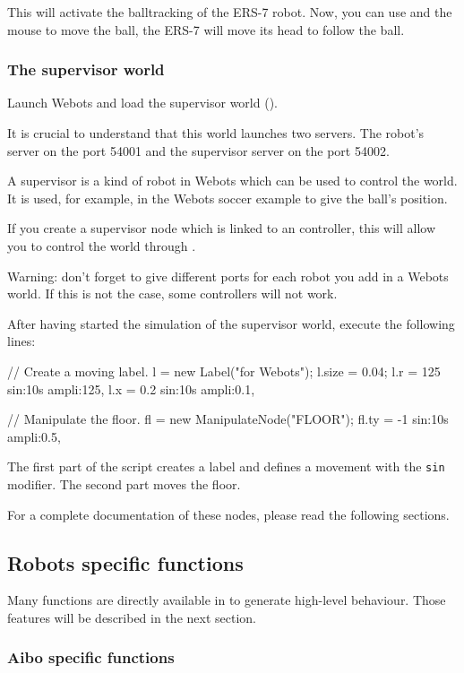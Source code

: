 This will activate the balltracking of the ERS-7 robot.  Now, you can
use  and the mouse to move the ball, the ERS-7 will move
its head to follow the ball.


\subsubsection{The supervisor world}

Launch Webots and load the supervisor world
().

It is crucial to understand that this world launches two \urbi
servers.  The robot's server on the port 54001 and the supervisor
server on the port 54002.

A supervisor is a kind of robot in Webots which can be used to control
the world. It is used, for example, in the Webots soccer example to
give the ball's position.

If you create a supervisor node which is linked to an \urbi
controller, this will allow you to control the world through \urbi.

Warning: don't forget to give different ports for each robot you add
in a Webots world. If this is not the case, some controllers will not
work.

After having started the simulation of the supervisor world, execute
the following lines:


\begin{urbifixme}
// Create a moving label.
l = new Label("\urbi for Webots");
l.size = 0.04;
l.r = 125 sin:10s ampli:125,
l.x = 0.2 sin:10s ampli:0.1,

// Manipulate the floor.
fl = new ManipulateNode("FLOOR");
fl.ty = -1 sin:10s ampli:0.5,
\end{urbifixme}

The first part of the script creates a label and defines a movement
with the \lstinline|sin| modifier. The second part moves the floor.

For a complete documentation of these nodes, please read the following
sections.

\subsection{Robots specific functions}

Many functions are directly available in \us to generate high-level
behaviour. Those features will be described in the next section.


\subsubsection{Aibo specific functions}


